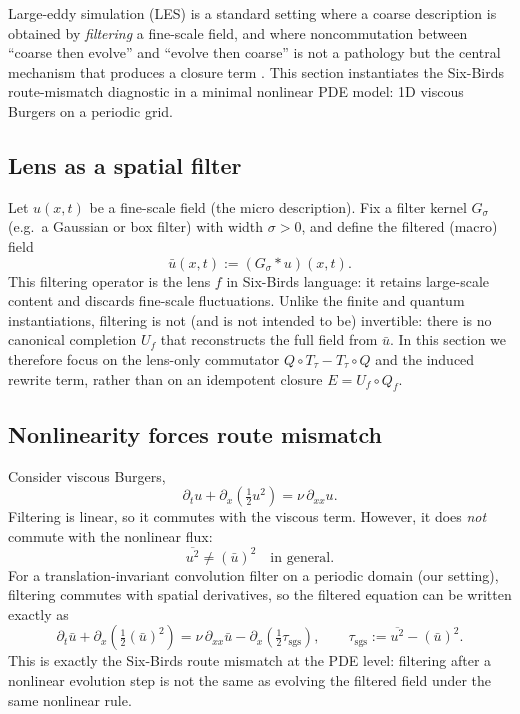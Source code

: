 \documentclass[11pt]{article}
\providecommand{\Lens}{f}
\providecommand{\Qf}{Q_f}
\providecommand{\Uf}{U_f}
\begin{document}
Large-eddy simulation (LES) is a standard setting where a coarse description is obtained by \emph{filtering} a fine-scale field, and where noncommutation between ``coarse then evolve'' and ``evolve then coarse'' is not a pathology but the central mechanism that produces a closure term \citep{germano1992,pope2000,sagaut2006,leonard1974,smagorinsky1963}. This section instantiates the Six-Birds route-mismatch diagnostic in a minimal nonlinear PDE model: 1D viscous Burgers on a periodic grid.

\subsection{Lens as a spatial filter}
Let $u(x,t)$ be a fine-scale field (the micro description). Fix a filter kernel $G_\sigma$ (e.g.\ a Gaussian or box filter) with width $\sigma>0$, and define the filtered (macro) field
\[
  \bar{u}(x,t) := (G_\sigma * u)(x,t).
\]
This filtering operator is the lens $\Lens$ in Six-Birds language: it retains large-scale content and discards fine-scale fluctuations.
Unlike the finite and quantum instantiations, filtering is not (and is not intended to be) invertible: there is no canonical completion $\Uf$ that reconstructs the full field from $\bar{u}$. In this section we therefore focus on the lens-only commutator $Q\circ T_\tau - T_\tau\circ Q$ and the induced rewrite term, rather than on an idempotent closure $E=\Uf\circ\Qf$.

\subsection{Nonlinearity forces route mismatch}
Consider viscous Burgers,
\[
  \partial_t u + \partial_x\!\left(\tfrac{1}{2}u^2\right) = \nu\,\partial_{xx}u.
\]
Filtering is linear, so it commutes with the viscous term. However, it does \emph{not} commute with the nonlinear flux:
\[
  \overline{u^2} \neq (\bar{u})^2 \quad \text{in general}.
\]
For a translation-invariant convolution filter on a periodic domain (our setting), filtering commutes with spatial derivatives, so the filtered equation can be written exactly as
\[
  \partial_t \bar u + \partial_x\!\left(\tfrac{1}{2}(\bar u)^2\right)
  = \nu\,\partial_{xx}\bar u - \partial_x\!\left(\tfrac{1}{2}\tau_{\mathrm{sgs}}\right),
  \qquad
  \tau_{\mathrm{sgs}} := \overline{u^2} - (\bar u)^2.
\]
This is exactly the Six-Birds route mismatch at the PDE level: filtering after a nonlinear evolution step is not the same as evolving the filtered field under the same nonlinear rule.
\end{document}
